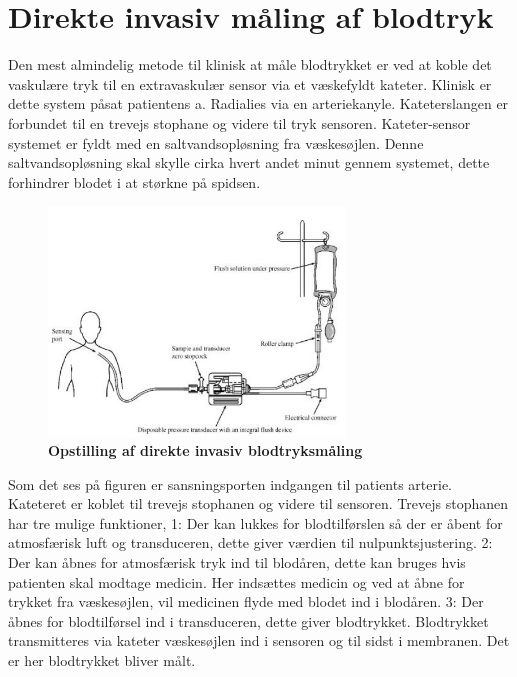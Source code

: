 \section{Direkte invasiv måling af blodtryk}
Den mest almindelig metode til klinisk at måle blodtrykket er ved at koble det vaskulære tryk til en extravaskulær sensor via et væskefyldt kateter. Klinisk er dette system påsat patientens a. Radialies via en arteriekanyle. Kateterslangen er forbundet til en trevejs stophane og videre til tryk sensoren. Kateter-sensor systemet er fyldt med en saltvandsopløsning fra væskesøjlen. Denne saltvandsopløsning skal skylle cirka hvert andet minut gennem systemet, dette forhindrer blodet i at størkne på spidsen.
\begin{figure}[H]
\includegraphics[width =0.7\textwidth , center]{billeder/kateter}
\caption{\textbf{Opstilling af direkte invasiv blodtryksmåling}}
\end{figure}
Som det ses på figuren er sansningsporten indgangen til patients arterie. Kateteret er koblet til trevejs stophanen og videre til sensoren. Trevejs stophanen har tre mulige funktioner, 1: Der kan lukkes for blodtilførslen så der er åbent for atmosfærisk luft og transduceren, dette giver værdien til nulpunktsjustering. 2: Der kan åbnes for atmosfærisk tryk ind til blodåren, dette kan bruges hvis patienten skal modtage medicin. Her indsættes medicin og ved at åbne for trykket fra væskesøjlen, vil medicinen flyde med blodet ind i blodåren. 3: Der åbnes for blodtilførsel ind i transduceren, dette giver blodtrykket. Blodtrykket transmitteres via kateter væskesøjlen ind i sensoren og til sidst i membranen. Det er her blodtrykket bliver målt. 
